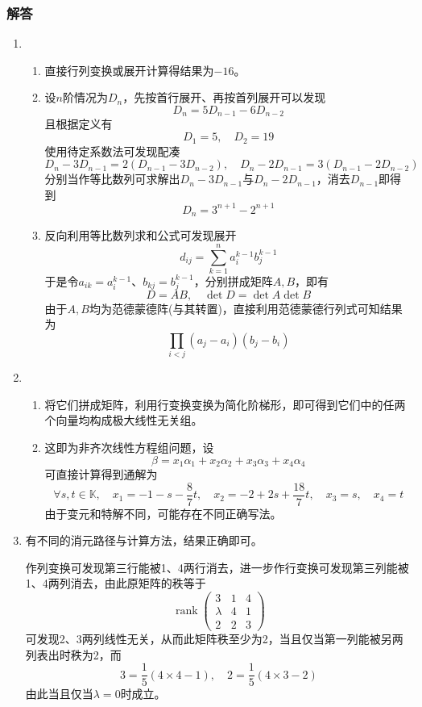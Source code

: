 \documentclass[a4paper,UTF8,fontset=windows]{ctexart}
\DeclareMathOperator{\rank}{rank}
\newcommand*{\note}{\noindent *}
\begin{document}
\subsubsection{解答}
\begin{enumerate}
    \item
    \begin{enumerate}
        \item 直接行列变换或展开计算得结果为$-16$。
        \item 设$n$阶情况为$D_n$，先按首行展开、再按首列展开可以发现
        $$D_n=5D_{n-1}-6D_{n-2}$$
        且根据定义有
        $$D_1=5,\quad D_2=19$$
        使用待定系数法可发现配凑
        $$D_n-3D_{n-1}=2(D_{n-1}-3D_{n-2}),\quad D_n-2D_{n-1}=3(D_{n-1}-2D_{n-2})$$
        分别当作等比数列可求解出$D_n-3D_{n-1}$与$D_n-2D_{n-1}$，消去$D_{n-1}$即得到
        $$D_n=3^{n+1}-2^{n+1}$$
        \item 反向利用等比数列求和公式可发现展开
        $$d_{ij}=\sum_{k=1}^na_i^{k-1}b_j^{k-1}$$
        于是令$a_{ik}=a_i^{k-1}$、$b_{kj}=b_j^{k-1}$，分别拼成矩阵$A,B$，即有
        $$D=AB,\quad\det D=\det A\det B$$
        由于$A,B$均为范德蒙德阵(与其转置)，直接利用范德蒙德行列式可知结果为
        $$\prod_{i<j}(a_j-a_i)(b_j-b_i)$$

    \end{enumerate}
    
    \item
    \begin{enumerate}
        \item 将它们拼成矩阵，利用行变换变换为简化阶梯形，即可得到它们中的任两个向量均构成极大线性无关组。
        \item 这即为非齐次线性方程组问题，设
        $$\beta=x_1\alpha_1+x_2\alpha_2+x_3\alpha_3+x_4\alpha_4$$
        可直接计算得到通解为
        $$\forall s,t\in\mathbb{K},\quad x_1=-1-s-\frac{8}{7}t,\quad x_2=-2+2s+\frac{18}{7}t,\quad x_3=s,\quad x_4=t$$
        \note 由于变元和特解不同，可能存在不同正确写法。
    \end{enumerate}

    \item
    \note 有不同的消元路径与计算方法，结果正确即可。
    
    作列变换可发现第三行能被1、4两行消去，进一步作行变换可发现第三列能被1、4两列消去，由此原矩阵的秩等于
    $$\rank\begin{pmatrix}3&1&4\\\lambda&4&1\\2&2&3\end{pmatrix}$$
    可发现2、3两列线性无关，从而此矩阵秩至少为2，当且仅当第一列能被另两列表出时秩为2，而
    $$3=\frac{1}{5}(4\times 4-1),\quad 2=\frac{1}{5}(4\times 3-2)$$
    由此当且仅当$\lambda=0$时成立。


\end{enumerate}
\end{document}
